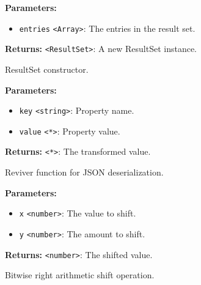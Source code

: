 \documentclass[12pt,a4paper]{article}
\begin{document}
\vspace{5mm}
\noindent {}


\noindent \textbf{Parameters:}
\begin{itemize}
  \item \texttt{entries} \texttt{<Array>}: The entries in the result set.
\end{itemize}

\noindent \textbf{Returns:} \texttt{<ResultSet>}: A new ResultSet instance.

\noindent ResultSet constructor.

\vspace{5mm}
\noindent {}


\noindent \textbf{Parameters:}
\begin{itemize}
  \item \texttt{key} \texttt{<string>}: Property name.
  \item \texttt{value} \texttt{<*>}: Property value.
\end{itemize}

\noindent \textbf{Returns:} \texttt{<*>}: The transformed value.

\noindent Reviver function for JSON deserialization.

\vspace{5mm}
\noindent {}


\noindent \textbf{Parameters:}
\begin{itemize}
  \item \texttt{x} \texttt{<number>}: The value to shift.
  \item \texttt{y} \texttt{<number>}: The amount to shift.
\end{itemize}

\noindent \textbf{Returns:} \texttt{<number>}: The shifted value.

\noindent Bitwise right arithmetic shift operation.

\vspace{5mm}
\noindent {}
\end{document}
